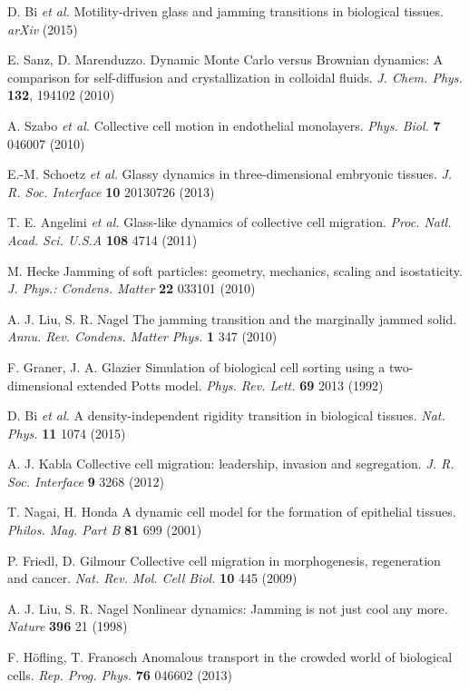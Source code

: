 \documentclass[a4paper,12pt]{article}
\newcommand{\etal}{\emph{et al. }}
\begin{document}
%   
%
\begin{thebibliography}{99}
		D. Bi \etal
		Motility-driven glass and jamming transitions in biological tissues.
		\emph{arXiv}
		(2015)
	
		E. Sanz, D. Marenduzzo.
		Dynamic Monte Carlo versus Brownian dynamics: A comparison for self-diffusion and crystallization in colloidal fluids.
		\emph{J. Chem. Phys.}
		\textbf{132}, 194102 (2010)
	
		A. Szabo \etal
		Collective cell motion in endothelial monolayers.
		\emph{Phys. Biol.}
		\textbf{7} 046007 (2010)
		
		E.-M. Schoetz \etal
		Glassy dynamics in three-dimensional embryonic tissues.
		\emph{J. R. Soc. Interface}
		\textbf{10} 20130726 (2013)
	
		T. E. Angelini \etal
		Glass-like dynamics of collective cell migration.
		\emph{Proc. Natl. Acad. Sci. U.S.A}
		\textbf{108} 4714 (2011)
	
		M. Hecke
		Jamming of soft particles: geometry, mechanics, scaling and isostaticity.
		\emph{J. Phys.: Condens. Matter}
		\textbf{22} 033101 (2010)
	
		A. J. Liu, S. R. Nagel
		The jamming transition and the marginally jammed solid.
		\emph{Annu. Rev. Condens. Matter Phys.}
		\textbf{1} 347 (2010)
		
		F. Graner, J. A. Glazier
		Simulation of biological cell sorting using a two-dimensional extended Potts model.
		\emph{Phys. Rev. Lett.}
		\textbf{69} 2013 (1992)
	
		D. Bi \etal
		A density-independent rigidity transition in biological tissues.
		\emph{Nat. Phys.}
		\textbf{11} 1074 (2015)
		
		A. J. Kabla
		Collective cell migration: leadership, invasion and segregation.
		\emph{J. R. Soc. Interface}
		\textbf{9} 3268 (2012)
	
		T. Nagai, H. Honda
		A dynamic cell model for the formation of epithelial tissues.
		\emph{Philos. Mag. Part B}
		\textbf{81} 699 (2001)
	
		P. Friedl, D. Gilmour
		Collective cell migration in morphogenesis, regeneration and cancer.
		\emph{Nat. Rev. Mol. Cell Biol.}
		\textbf{10} 445 (2009)
	
		A. J. Liu, S. R. Nagel
		Nonlinear dynamics: Jamming is not just cool any more.
		\emph{Nature}
		\textbf{396} 21 (1998)
		
		F. H\"ofling, T. Franosch
		Anomalous transport in the crowded world of biological cells.
		\emph{Rep. Prog. Phys.}
		\textbf{76} 046602 (2013)

\end{thebibliography}
\end{document}
